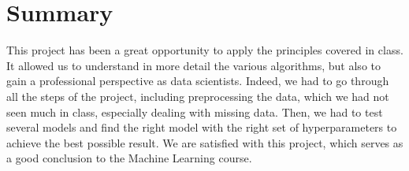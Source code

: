 \section{Summary}

This project has been a great opportunity to apply the principles covered in class. It allowed us to understand in more detail the various algorithms, but also to gain a professional perspective as data scientists. Indeed, we had to go through all the steps of the project, including preprocessing the data, which we had not seen much in class, especially dealing with missing data. Then, we had to test several models and find the right model with the right set of hyperparameters to achieve the best possible result. We are satisfied with this project, which serves as a good conclusion to the Machine Learning course.